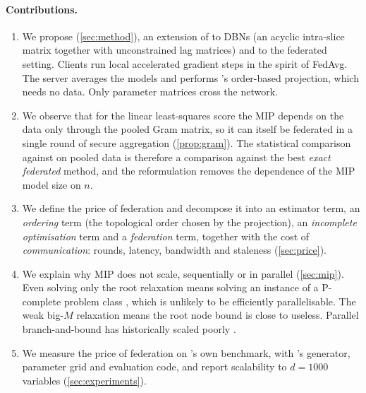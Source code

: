 \paragraph{Contributions.}
\begin{enumerate}
  \item We propose \feddbn{} (\cref{sec:method}), an extension of \psidag{} \citep{ziu2024psi}
  to DBNs (an acyclic intra-slice matrix together with unconstrained lag matrices) and to the
  federated setting. Clients run local accelerated gradient steps in the spirit of FedAvg. The
  server averages the models and performs \psidag's order-based projection, which needs no
  data. Only parameter matrices cross the network.
  \item We observe that for the linear least-squares score the \exdbn{} MIP depends on the data
  only through the pooled Gram matrix, so it can itself be federated in a single round of
  secure aggregation (\cref{prop:gram}). The statistical comparison against \exdbn{} on pooled
  data is therefore a comparison against the best \emph{exact federated} method, and the
  reformulation removes the dependence of the MIP model size on $n$.
  \item We define the price of federation and decompose it into an estimator term, an
  \emph{ordering} term (the topological order chosen by the projection), an \emph{incomplete
  optimisation} term and a \emph{federation} term, together with the cost of
  \emph{communication}: rounds, latency, bandwidth and staleness (\cref{sec:price}).
  \item We explain why MIP does not scale, sequentially or in parallel
  (\cref{sec:mip}). Even solving only the root relaxation means solving an instance of
  a P-complete problem class \citep{dobkin1979lp,serna1991approximating}, which is unlikely to
  be efficiently parallelisable. The weak big-$M$ relaxation means the root node bound is
  close to useless. Parallel branch-and-bound has historically scaled poorly
  \citep{shinano2010parascip,koch2012million,bernalneira2024survey}.
  \item We measure the price of federation on \exdbn's own benchmark, with \exdbn's generator,
  parameter grid and evaluation code, and report scalability to $d=1000$ variables
  (\cref{sec:experiments}).
\end{enumerate}
